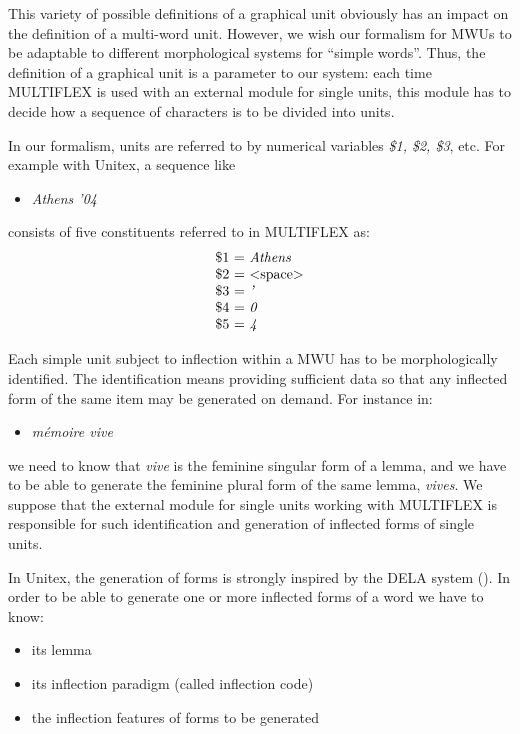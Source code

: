 \bigskip
\noindent This variety of possible definitions of a graphical unit obviously has an 
impact on the definition of a multi-word unit. However, we wish our formalism for MWUs 
to be adaptable to different morphological systems for ``simple words''. Thus, the 
definition of a graphical unit is a parameter to our system: each time MULTIFLEX is 
used with an external module for single units, this module has to decide how a sequence 
of characters is to be divided into units.

\bigskip
\noindent In our formalism, units are referred to by numerical variables \emph{\$1, \$2, \$3}, etc. 
For example with Unitex, a sequence like

\begin{itemize}
\item \emph{Athens '04}
\end{itemize} 

\bigskip
\noindent consists of five constituents referred to in MULTIFLEX as:
\[
\begin{array}[c]{l}
$\$1 = \emph{Athens}$ \\
$\$2 = $<$space$>$$ \\
$\$3 = \emph{'}$ \\
$\$4 = \emph{0}$ \\
$\$5 = \emph{4}$ \\
\end{array}
\]

\bigskip
\noindent Each simple unit subject to inflection within a MWU has to be morphologically 
identified. The identification means providing sufficient data so that any inflected form 
of the same item may be generated on demand. For instance in:
\begin{itemize}
\item \emph{m\'emoire vive}
\end{itemize} 
we need to know that \emph{vive} is the feminine singular form of a lemma, and we have to 
be able to generate the feminine plural form of the same lemma, \emph{vives}. We suppose 
that the external module for single units working with MULTIFLEX is responsible for such 
identification and generation of inflected forms of single units.

\bigskip
\noindent In Unitex, the generation of forms is strongly inspired by the DELA
system (\cite{dicos-francais}). In order to be able to generate one or more 
inflected forms of a word we have to know:

\begin{itemize}
\item its lemma
\item its inflection paradigm (called inflection code)
\item the inflection features of forms to be generated
\end{itemize}

